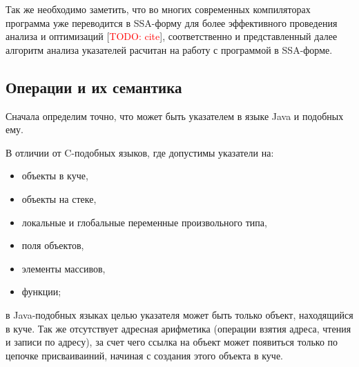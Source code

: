 \documentclass[14pt,titlepage]{extarticle}
\newcommand{\todo}[1]{\textcolor{red}{\eng{TODO}: #1}}
\newcommand{\todocite}{[\todo{cite}]}
\newcommand{\eng}[1]{{\English#1}}
\begin{document}
      Так же необходимо заметить, что во многих современных компиляторах
      программа уже переводится в SSA-форму для более эффективного проведения
      анализа и оптимизаций \todocite, соответственно и представленный далее
      алгоритм анализа указателей расчитан на работу с программой в SSA-форме.

    \subsection{Операции и их семантика}
      \label{section:instructions}

      Сначала определим точно, что может быть указателем в языке Java и
      подобных ему.

      В отличии от C-подобных языков, где допустимы указатели на:
      \begin{itemize}
        \item объекты в куче,
        \item объекты на стеке,
        \item локальные и глобальные переменные произвольного типа,
        \item поля объектов,
        \item элементы массивов,
        \item функции;
      \end{itemize}
      в Java-подобных языках целью
      указателя может быть только объект, находящийся в куче. Так же
      отсутствует адресная арифметика (операции взятия адреса,
      чтения и записи по адресу), за счет чего ссылка на объект может
      появиться только по цепочке присваиваиний, начиная с создания этого
      объекта в куче.
\end{document}
